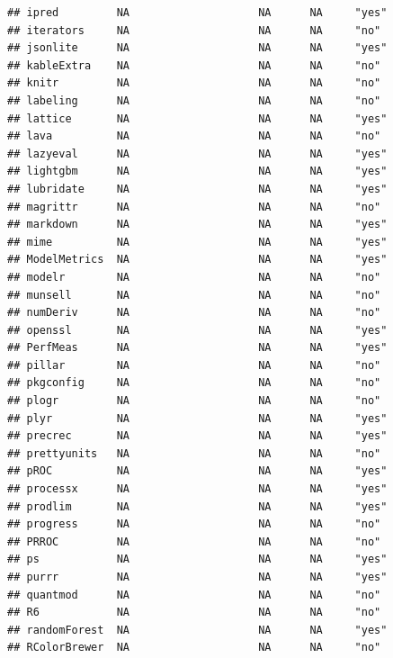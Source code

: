 \documentclass[]{article}
\begin{document}
\begin{verbatim}
## ipred         NA                    NA      NA     "yes"           
## iterators     NA                    NA      NA     "no"            
## jsonlite      NA                    NA      NA     "yes"           
## kableExtra    NA                    NA      NA     "no"            
## knitr         NA                    NA      NA     "no"            
## labeling      NA                    NA      NA     "no"            
## lattice       NA                    NA      NA     "yes"           
## lava          NA                    NA      NA     "no"            
## lazyeval      NA                    NA      NA     "yes"           
## lightgbm      NA                    NA      NA     "yes"           
## lubridate     NA                    NA      NA     "yes"           
## magrittr      NA                    NA      NA     "no"            
## markdown      NA                    NA      NA     "yes"           
## mime          NA                    NA      NA     "yes"           
## ModelMetrics  NA                    NA      NA     "yes"           
## modelr        NA                    NA      NA     "no"            
## munsell       NA                    NA      NA     "no"            
## numDeriv      NA                    NA      NA     "no"            
## openssl       NA                    NA      NA     "yes"           
## PerfMeas      NA                    NA      NA     "yes"           
## pillar        NA                    NA      NA     "no"            
## pkgconfig     NA                    NA      NA     "no"            
## plogr         NA                    NA      NA     "no"            
## plyr          NA                    NA      NA     "yes"           
## precrec       NA                    NA      NA     "yes"           
## prettyunits   NA                    NA      NA     "no"            
## pROC          NA                    NA      NA     "yes"           
## processx      NA                    NA      NA     "yes"           
## prodlim       NA                    NA      NA     "yes"           
## progress      NA                    NA      NA     "no"            
## PRROC         NA                    NA      NA     "no"            
## ps            NA                    NA      NA     "yes"           
## purrr         NA                    NA      NA     "yes"           
## quantmod      NA                    NA      NA     "no"            
## R6            NA                    NA      NA     "no"            
## randomForest  NA                    NA      NA     "yes"           
## RColorBrewer  NA                    NA      NA     "no"            

\end{verbatim}
\end{document}
